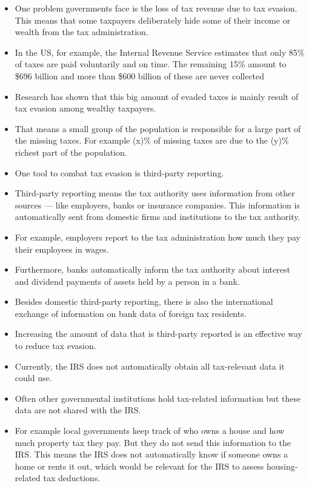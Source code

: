 \documentclass[11pt]{article}
\begin{document}
\begin{itemize}
    \item One problem governments face is the loss of tax revenue due to tax evasion. This means that some taxpayers deliberately hide some of their income or wealth from the tax administration. 
    \item In the US, for example, the Internal Revenue Service estimates that only 85\% of taxes are paid voluntarily and on time. The remaining 15\% amount to \$696 billion and more than \$600 billion of these are never collected
    \item Research has shown that this big amount of evaded taxes is mainly result of tax evasion among wealthy taxpayers.
    \item That means a small group of the population is responsible for a large part of the missing taxes. For example (x)\% of missing taxes are due to the (y)\% richest part of the population. 
    \item One tool to combat tax evasion is third-party reporting.
    \item Third-party reporting means the tax authority uses information from other sources --- like employers, banks or insurance companies. This information is automatically sent from domestic firms and institutions to the tax authority.
    \item For example, employers report to the tax administration how much they pay their employees in wages.
    \item Furthermore, banks automatically inform the tax authority about interest and dividend payments of assets held by a person in a bank. 
    \item Besides domestic third-party reporting, there is also the international exchange of information on bank data of foreign tax residents. %
    \item Increasing the amount of data that is third-party reported is an effective way to reduce tax evasion.
    \item Currently, the IRS does not automatically obtain all tax-relevant data it could use.
    \item Often other governmental institutions hold tax-related information but these data are not shared with the IRS.
    \item For example local governments keep track of who owns a house and how much property tax they pay. But they do not send this information to the IRS. This means the IRS does not automatically know if someone owns a home or rents it out, which would be relevant for the IRS to assess housing-related tax deductions.

\end{itemize}
\end{document}
